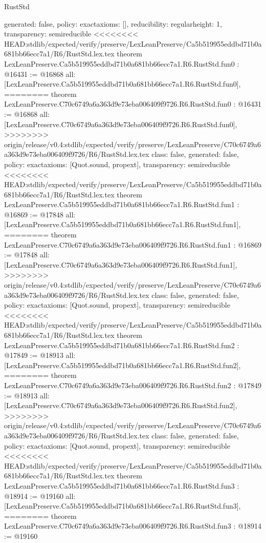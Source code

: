 \begin{lexlean}{RustStd}
\begin{coremodule}
{\begin{coremodule}
{{{  generated: false,
  policy: exact{axioms: []},
  reducibility: regular{height: 1},
  transparency: semireducible
}
<<<<<<<< HEAD:stdlib/expected/verify/preserve/LexLeanPreserve/Ca5b519955eddbd71b0a681bb66ecc7a1/R6/RustStd.lex.tex
theorem LexLeanPreserve.Ca5b519955eddbd71b0a681bb66ecc7a1.R6.RustStd.fun0 : @16431 := @16868 {
  all: [LexLeanPreserve.Ca5b519955eddbd71b0a681bb66ecc7a1.R6.RustStd.fun0],
========
theorem LexLeanPreserve.C70c6749a6a363d9e73eba006409f9726.R6.RustStd.fun0 : @16431 := @16868 {
  all: [LexLeanPreserve.C70c6749a6a363d9e73eba006409f9726.R6.RustStd.fun0],
>>>>>>>> origin/release/v0.4:stdlib/expected/verify/preserve/LexLeanPreserve/C70c6749a6a363d9e73eba006409f9726/R6/RustStd.lex.tex
  class: false,
  generated: false,
  policy: exact{axioms: [Quot.sound, propext]},
  transparency: semireducible
}
<<<<<<<< HEAD:stdlib/expected/verify/preserve/LexLeanPreserve/Ca5b519955eddbd71b0a681bb66ecc7a1/R6/RustStd.lex.tex
theorem LexLeanPreserve.Ca5b519955eddbd71b0a681bb66ecc7a1.R6.RustStd.fun1 : @16869 := @17848 {
  all: [LexLeanPreserve.Ca5b519955eddbd71b0a681bb66ecc7a1.R6.RustStd.fun1],
========
theorem LexLeanPreserve.C70c6749a6a363d9e73eba006409f9726.R6.RustStd.fun1 : @16869 := @17848 {
  all: [LexLeanPreserve.C70c6749a6a363d9e73eba006409f9726.R6.RustStd.fun1],
>>>>>>>> origin/release/v0.4:stdlib/expected/verify/preserve/LexLeanPreserve/C70c6749a6a363d9e73eba006409f9726/R6/RustStd.lex.tex
  class: false,
  generated: false,
  policy: exact{axioms: [Quot.sound, propext]},
  transparency: semireducible
}
<<<<<<<< HEAD:stdlib/expected/verify/preserve/LexLeanPreserve/Ca5b519955eddbd71b0a681bb66ecc7a1/R6/RustStd.lex.tex
theorem LexLeanPreserve.Ca5b519955eddbd71b0a681bb66ecc7a1.R6.RustStd.fun2 : @17849 := @18913 {
  all: [LexLeanPreserve.Ca5b519955eddbd71b0a681bb66ecc7a1.R6.RustStd.fun2],
========
theorem LexLeanPreserve.C70c6749a6a363d9e73eba006409f9726.R6.RustStd.fun2 : @17849 := @18913 {
  all: [LexLeanPreserve.C70c6749a6a363d9e73eba006409f9726.R6.RustStd.fun2],
>>>>>>>> origin/release/v0.4:stdlib/expected/verify/preserve/LexLeanPreserve/C70c6749a6a363d9e73eba006409f9726/R6/RustStd.lex.tex
  class: false,
  generated: false,
  policy: exact{axioms: [Quot.sound, propext]},
  transparency: semireducible
}
<<<<<<<< HEAD:stdlib/expected/verify/preserve/LexLeanPreserve/Ca5b519955eddbd71b0a681bb66ecc7a1/R6/RustStd.lex.tex
theorem LexLeanPreserve.Ca5b519955eddbd71b0a681bb66ecc7a1.R6.RustStd.fun3 : @18914 := @19160 {
  all: [LexLeanPreserve.Ca5b519955eddbd71b0a681bb66ecc7a1.R6.RustStd.fun3],
========
theorem LexLeanPreserve.C70c6749a6a363d9e73eba006409f9726.R6.RustStd.fun3 : @18914 := @19160 {
}}}}}}}
\end{coremodule}}
\end{coremodule}
\end{lexlean}
